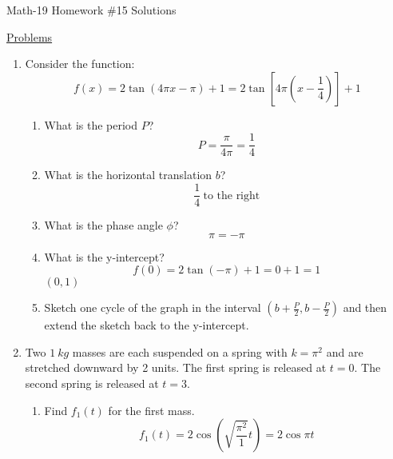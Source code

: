 \documentclass[letterpaper,12pt,fleqn]{article}
\begin{document}
\begin{center}
\Large Math-19 Homework \#15 Solutions
\end{center}

\vspace{0.5in}

\underline{Problems}

\begin{enumerate}

\item Consider the function:
  \[f(x)=2\tan(4\pi x-\pi)+1=
  2\tan\left[4\pi\left(x-\frac{1}{4}\right)\right]+1\]
  \begin{enumerate}
  \item What is the period $P$?
    \[P=\frac{\pi}{4\pi}=\frac{1}{4}\]
    
  \item What is the horizontal translation $b$?
    \[\frac{1}{4}\ \mbox{to the right}\]
    
  \item What is the phase angle $\phi$?
    \[\pi=-\pi\]
    
  \item What is the y-intercept?
    \[f(0)=2\tan(-\pi)+1=0+1=1\]
    $(0,1)$
    
  \item Sketch one cycle of the graph in the interval
    $\left(b+\frac{P}{2},b-\frac{P}{2}\right)$ and then extend the sketch back
    to the y-intercept.

  \end{enumerate}

\item Two $\SI{1}{kg}$ masses are each suspended on a spring with $k=\pi^2$ and
  are stretched downward by 2 units. The first spring is released at $t=0$. The
  second spring is released at $t=3$.
  \begin{enumerate}
  \item Find $f_1(t)$ for the first mass.
    \[f_1(t)=2\cos\left(\sqrt{\frac{\pi^2}{1}}t\right)=2\cos\pi t\]
    

\end{enumerate}
\end{enumerate}
\end{document}
